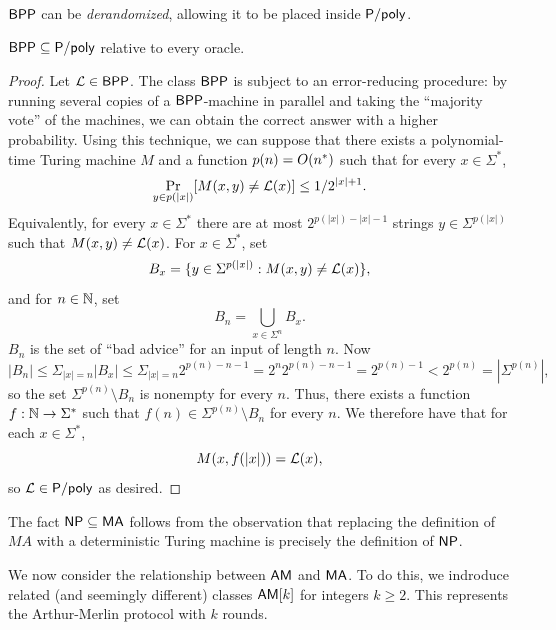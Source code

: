 $\mathsf{BPP}$ can be \textit{derandomized}, allowing it to be placed inside
$\mathsf{P}/\mathsf{poly}$.

\begin{theorem}
$\mathsf{BPP}\subseteq\mathsf{P}/\mathsf{poly}$ relative to every oracle.
\end{theorem}

\begin{proof}
Let $\mathcal{L}\in\mathsf{BPP}$. The class $\mathsf{BPP}$ is subject to an error-reducing
procedure: by running several copies of a $\mathsf{BPP}$-machine in parallel and
taking the ``majority vote'' of the machines, we can obtain the correct answer
with a higher probability. Using this technique, we can suppose that there
exists a polynomial-time Turing machine $M$ and a function $p(n)=O(n^*)$ such
that for every $x\in\Sigma^*$,
\[
\Pr_{y\in p(|x|)}[M(x,y)\neq\mathcal{L}(x)]\leq 1/2^{|x|+1}.
\]
Equivalently, for every $x\in\Sigma^*$ there are at most $2^{p(|x|)-|x|-1}$ 
strings $y\in\Sigma^{p(|x|)}$ such that $M(x,y)\neq\mathcal{L}(x)$. For $x\in\Sigma^*$, 
set
\[
B_x=\{y\in\Sigma^{p(|x|)}:M(x,y)\neq\mathcal{L}(x)\},
\]
and for $n\in\mathbb{N}$, set
\[
B_n=\bigcup_{x\in\Sigma^n}B_x.
\]
$B_n$ is the set of ``bad advice'' for an input of length $n$. Now
\[
|B_n|\leq\Sigma_{|x|=n}|B_x|\leq\Sigma_{|x|=n}2^{p(n)-n-1}=2^n2^{p(n)-n-1}=
2^{p(n)-1}<2^{p(n)}=|\Sigma^{p(n)}|,
\]
so the set $\Sigma^{p(n)}\setminus B_n$ is nonempty for every $n$. Thus, there
exists a function $f:\mathbb{N}\rightarrow\Sigma^*$ such that $f(n)\in\Sigma^{p(n)}\setminus
B_n$ for every $n$. We therefore have that for each $x\in\Sigma^*$,
\[
M(x,f(|x|))=\mathcal{L}(x),
\]
so $\mathcal{L}\in\mathsf{P}/\mathsf{poly}$ as desired.
\end{proof}

The fact $\mathsf{NP}\subseteq\mathsf{MA}$ follows from the observation that replacing the 
definition of $MA$ with a deterministic Turing machine is precisely the 
definition of $\mathsf{NP}$.

We now consider the relationship between $\mathsf{AM}$ and $\mathsf{MA}$. To do this, 
we indroduce related (and seemingly different) classes $\mathsf{AM}[k]$ for 
integers $k\geq 2$. This represents the Arthur-Merlin protocol with $k$ rounds.

